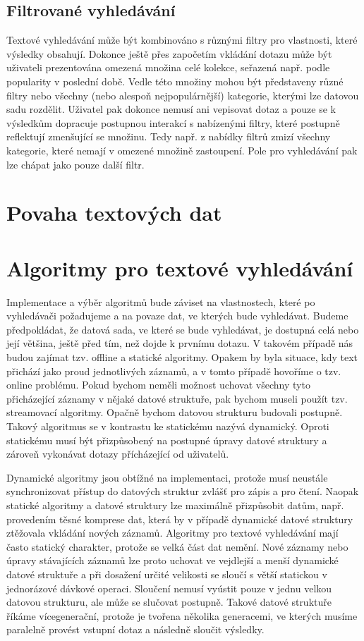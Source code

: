 \documentclass[11pt,letterpaper,oneside,openright]{book}
\begin{document}
\subsection{Filtrované vyhledávání}
Textové vyhledávání může být kombinováno s různými filtry pro vlastnosti, které
výsledky obsahují. Dokonce ještě přes započetím vkládání dotazu může být
uživateli prezentována omezená množina celé kolekce, seřazená např. podle
popularity v poslední době. Vedle této množiny mohou být představeny různé
filtry nebo všechny (nebo alespoň nejpopulárnější) kategorie, kterými lze
datovou sadu rozdělit. Uživatel pak dokonce nemusí ani vepisovat dotaz a pouze
se k výsledkům dopracuje postupnou interakcí s nabízenými filtry, které
postupně reflektují zmenšující se množinu. Tedy např. z nabídky filtrů zmizí
všechny kategorie, které nemají v omezené množině zastoupení. Pole pro
vyhledávání pak lze chápat jako pouze další filtr.

\section{Povaha textových dat}

\section{Algoritmy pro textové vyhledávání}
Implementace a výběr algoritmů bude záviset na vlastnostech, které po
vyhledávači požadujeme a na povaze dat, ve kterých bude vyhledávat. Budeme
předpokládat, že datová sada, ve které se bude vyhledávat, je dostupná celá
nebo její většina, ještě před tím, než dojde k prvnímu dotazu. V takovém
případě nás budou zajímat tzv. offline a statické algoritmy.  Opakem by byla
situace, kdy text přichází jako proud jednotlivých záznamů, a v tomto případě
hovoříme o tzv. online problému. Pokud bychom neměli možnost uchovat všechny
tyto přicházející záznamy v nějaké datové struktuře, pak bychom museli použít
tzv. streamovací algoritmy. Opačně bychom datovou strukturu budovali postupně.
Takový algoritmus se v kontrastu ke statickému nazývá dynamický. Oproti
statickému musí být přizpůsobený na postupné úpravy datové struktury a zároveň
vykonávat dotazy přícházející od uživatelů.

Dynamické algoritmy jsou obtížné na implementaci, protože musí neustále
synchronizovat přístup do datových struktur zvlášť pro zápis a pro čtení.
Naopak statické algoritmy a datové struktury lze maximálně přizpůsobit datům,
např. provedením těsné komprese dat, která by v případě dynamické datové
struktury ztěžovala vkládání nových záznamů. Algoritmy pro textové vyhledávání
mají často statický charakter, protože se velká část dat nemění. Nové záznamy
nebo úpravy stávajících záznamů lze proto uchovat ve vejdlejší a menší
dynamické datové struktuře a při dosažení určité velikosti se sloučí s větší
statickou v jednorázové dávkové operaci. Sloučení nemusí vyústit pouze v jednu
velkou datovou strukturu, ale může se slučovat postupně. Takové datové
struktuře říkáme vícegenerační, protože je tvořena několika generacemi, ve
kterých musíme paralelně provést vstupní dotaz a následně sloučit výsledky.
\end{document}
